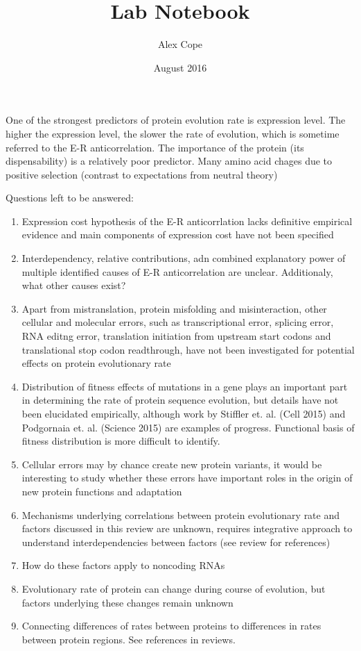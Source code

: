 \documentclass[11pt]{labbook}
\title{Lab Notebook}
\author{Alex Cope}
\date{August 2016}
\begin{document}
\maketitle
\tableofcontents



One of the strongest predictors of protein evolution rate is expression level. The higher the expression level, the slower the rate of evolution, which is sometime referred to the E-R anticorrelation. The importance of the protein (its dispensability) is a relatively poor predictor. 
Many amino acid chages due to positive selection (contrast to expectations from neutral theory)

Questions left to be answered:
\begin{enumerate}
\item Expression cost hypothesis of the E-R anticorrlation lacks definitive empirical evidence and main components of expression cost have not been specified
\item Interdependency, relative contributions, adn combined explanatory power of multiple identified causes of E-R anticorrelation are unclear. Additionaly, what other causes exist?
\item Apart from mistranslation, protein misfolding and misinteraction, other cellular and molecular errors, such as transcriptional error, splicing error, RNA editng error, translation initiation from upstream start codons and translational stop codon readthrough, have not been investigated for potential effects on protein evolutionary rate
\item Distribution of fitness effects of mutations in a gene plays an important part in determining the rate of protein sequence evolution, but details have not been elucidated empirically, although work by Stiffler et. al. (Cell 2015) and Podgornaia et. al. (Science 2015) are examples of progress. Functional basis of fitness distribution is more difficult to identify.
\item Cellular errors may by chance create new protein variants, it would be interesting to study whether these errors have important roles in the origin of new protein functions and adaptation
\item Mechanisms underlying correlations between protein evolutionary rate and factors discussed in this review are unknown, requires integrative approach to understand interdependencies between factors (see review for references)
\item How do these factors apply to noncoding RNAs
\item Evolutionary rate of protein can change during course of evolution, but factors underlying these changes remain unknown
\item Connecting differences of rates between proteins to differences in rates between protein regions. See references in reviews.
\end{enumerate}
\end{document}
